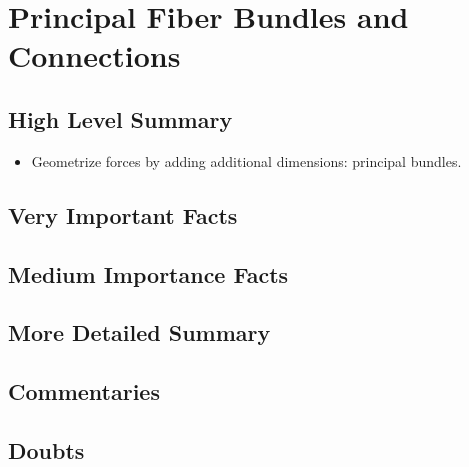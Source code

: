 \documentclass[12pt]{report}
\begin{document}
\chapter{Principal Fiber Bundles and Connections}
\section{High Level Summary}

\begin{itemize}
    \item Geometrize forces by adding additional dimensions: principal bundles.
\end{itemize}

\section{Very Important Facts}

\section{Medium Importance Facts}

\section{More Detailed Summary}

\section{Commentaries}

\section{Doubts}

\end{document}
